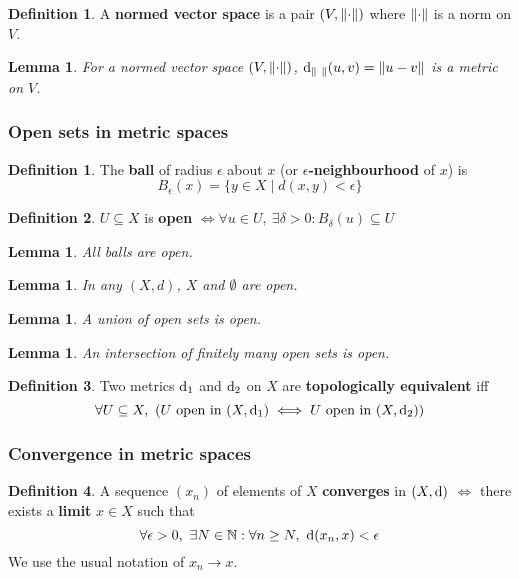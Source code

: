 \documentclass[12pt]{article}
\newtheorem{lem}[thm]{Lemma}
\theoremstyle{definition}
\newtheorem{defn}{Definition}[section]
\newtheorem*{defn*}{Definition}
\DeclarePairedDelimiter\length{\lVert}{\rVert}
\renewcommand{\d}{{\textnormal{d}}}
\begin{document}
\begin{defn*}
	A \textbf{normed vector space} is a pair $(V, \length{\cdot})$ where $\length{\cdot}$ is a norm on $V$.
\end{defn*}

\begin{lem}
	For a normed vector space $(V, \length{\cdot})$, $\d_{\length{\ }}(u, v) = \length{u - v}$ is a metric on $V$.
\end{lem}

\subsubsection{Open sets in metric spaces}

\begin{defn}
	The \textbf{ball} of radius $\epsilon$ about $x$ (or \textbf{$\epsilon$-neighbourhood} of $x$) is
	$$B_{\epsilon}(x) = \{y \in X \mid d(x, y) < \epsilon\}$$
\end{defn}

\begin{defn}
	$U \subseteq X$ is \textbf{open} $\iff \forall u \in U,\  \exists \delta > 0 : B_{\delta}(u) \subseteq U$
\end{defn}

\begin{lem}
	All balls are open.
\end{lem}

\begin{lem}
	In any $(X, d)$, $X$ and $\emptyset$ are open.
\end{lem}

\begin{lem}
	A union of open sets is open.
\end{lem}

\begin{lem}
	An intersection of finitely many open sets is open.
\end{lem}

\begin{defn}
	Two metrics $\d_1$ and $\d_2$ on $X$ are \textbf{topologically equivalent} iff
	$$\forall U \subseteq X ,\  (U \text{ open in } (X, \d_1) \iff U \text{ open in } (X, \d_2))$$
\end{defn}

\subsubsection{Convergence in metric spaces}

\begin{defn}
	A sequence $(x_n)$ of elements of $X$ \textbf{converges} in $(X, \d)$ $\iff$ there exists a \textbf{limit} $x \in X$ such that
	$$\forall\epsilon > 0,\  \exists N \in \mathbb{N} : \forall n \geq N,\  \d(x_n, x) < \epsilon$$
	We use the usual notation of $x_n \to x$.
\end{defn}
\end{document}

